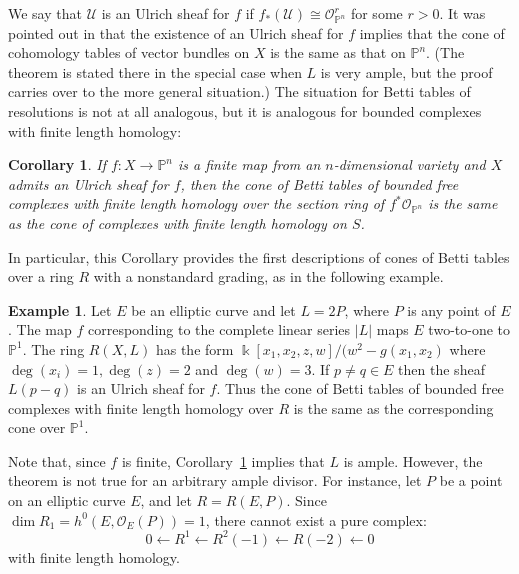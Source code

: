 \documentclass[12pt]{amsart}
\newtheorem{cor}[lemma]{Corollary}
\theoremstyle{definition}
\newtheorem{example}[lemma]{Example}
\theoremstyle{remark}
\newcommand{\kk}{\Bbbk}
\newcommand{\PP}{\mathbb{P}}
\newcommand{\cO}{\mathcal{O}}
\newcommand{\cU}{\mathcal{U}}
\newcommand{\defi}[1]{\textsf{#1}} %
\newcommand{\david}[1]{{\color{red} \sf $\clubsuit\clubsuit\clubsuit$ David: [#1]}}
\renewcommand{\P}{{\mathbb P}}
\begin{document}
We say that $\cU$ is an \defi{Ulrich sheaf} for $f$ if $f_*(\cU)\cong \cO_{\PP^n}^r$ for some $r>0$.  It was pointed out in \cite[Theorem~5]{eis-schrey-abel} that the existence of an Ulrich sheaf for $f$ implies that  the cone of cohomology tables of vector bundles on $X$ is the same as that on $\PP^{n}$. (The theorem is stated there in the special case when $L$ is very ample, but the proof
carries over to the more general situation.) The situation for Betti tables of resolutions is not at all analogous, but it is analogous for bounded complexes with finite length homology:


\begin{cor}\label{cor:isom cones}
If $f:X\to \P^{n}$ is a  finite map from an $n$-dimensional variety and $X$ admits an Ulrich sheaf for $f$, then the cone of Betti tables
of bounded free complexes with finite length homology over  the section ring
of $f^{*}\cO_{\P^{n}}$ is the same
as the cone of complexes with finite length homology  on $S$. 
\end{cor}

 In particular, this Corollary provides the first descriptions of cones of Betti tables over a ring $R$ with a nonstandard grading, as in the following example.

\begin{example}\label{ex:elliptic}
Let $E$ be an elliptic curve and let $L=2P$, where $P$ is any point of $E$.  The map $f$ corresponding to the complete
linear series $|L|$ maps $E$ two-to-one to $\P^{1}$. The ring $R(X,L)$ has the form
$\kk[x_1,x_2,z,w]/(w^{2}-g(x_{1},x_{2})$  where $\deg(x_i)=1, \deg(z)=2$ and $\deg(w)=3$. 
If $p\neq q\in E$ then the sheaf $L(p-q)$ is an Ulrich sheaf for $f$. Thus the cone of
Betti tables of bounded free complexes with finite length homology over $R$ is the same
as the corresponding cone over $\P^{1}$.
\end{example}

Note that, since $f$ is finite, Corollary~\ref{cor:isom cones} implies that $L$ is ample.  However, the theorem is not true for an arbitrary ample divisor.  For instance, let $P$ be a point on an elliptic curve $E$, and let $R=R(E,P)$.  Since $\dim R_1=h^0(E,\cO_E(P))=1$, there cannot exist a pure complex:
\[
0\gets R^1\gets R^2(-1)\gets R(-2)\gets 0
\]
with finite length homology.
\end{document}
